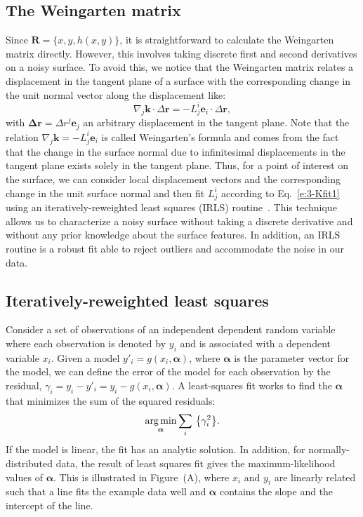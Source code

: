 \subsection{The Weingarten matrix}
Since $\mathbf{R} = \{x, y, h(x,y)\}$, it is straightforward to calculate the Weingarten matrix directly.
However, this involves taking discrete first and second derivatives on a noisy surface.
To avoid this, we notice that the Weingarten matrix relates a displacement in the tangent plane of a surface with the corresponding change in the unit normal vector along the displacement like:
\begin{equation}
\nabla_j \mathbf{k} \cdot \Delta \mathbf{r} = -L^i_j \mathbf{e}_i \cdot \Delta \mathbf{r},\label{e:3-Kfit1}
\end{equation}
with $\mathbf{\Delta r} = \Delta r^j \mathbf{e}_j$ an arbitrary displacement in the tangent plane.
Note that the relation $\nabla_j \mathbf{k} = -L^i_j \mathbf{e}_i$ is called Weingarten's formula and comes from the fact that the change in the surface normal due to infinitesimal displacements in the tangent plane exists solely in the tangent plane.
Thus, for a point of interest on the surface, we can consider local displacement vectors and the corresponding change in the unit surface normal and then fit $L^i_j$ according to Eq.~\ref{e:3-Kfit1} using an iteratively-reweighted least squares (IRLS) routine~\cite{RN32,RN31}.
This technique allows us to characterize a noisy surface without taking a discrete derivative and without any prior knowledge about the surface features.
In addition, an IRLS routine is a robust fit able to reject outliers and accommodate the noise in our data.


\subsection{Iteratively-reweighted least squares}
Consider a set of observations of an independent dependent random variable where each observation is denoted by $y_i$ and is associated with a dependent variable $x_i$.
Given a model $y'_i = g(x_i,\bm{\alpha})$, where $\bm{\alpha}$ is the parameter vector for the model, we can define the error of the model for each observation by the residual, $\gamma_i = y_i - y'_i = y_i - g(x_i,\bm{\alpha})$.
A least-squares fit works to find the $\bm{\alpha}$ that minimizes the sum of the squared residuals:
\begin{equation}
  \operatorname*{arg\,min}_{\bm{\alpha}} \sum\limits_i\, \big \{ \gamma_i^2\big \}.\label{e:3-LeastSquare}
\end{equation}
If the model is linear, the fit has an analytic solution.
In addition, for normally-distributed data, the result of least squares fit gives the maximum-likelihood values of $\bm{\alpha}$.
This is illustrated in Figure~(A), where $x_i$ and $y_i$ are linearly related such that a line fits the example data well and $\bm{\alpha}$ contains the slope and the intercept of the line.\\

